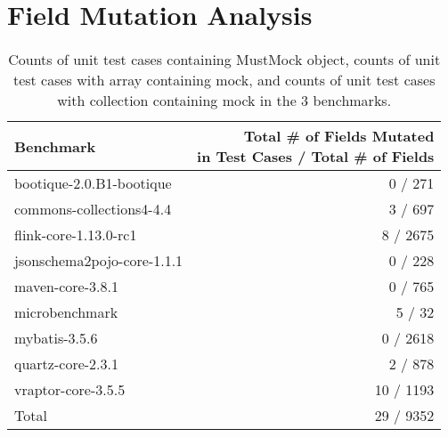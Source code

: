 \chapter{Field Mutation Analysis}
\label{AppendixA}

\begin{table*}[b]
	\centering
	\caption{Counts of unit test cases containing MustMock object, counts of unit test cases with array containing mock, and counts of unit test cases with collection containing mock in the 3 benchmarks.}
	\begin{tabular}{lr}
		\toprule
		Benchmark &  \thead{ Total \# of Fields Mutated \\ in Test Cases / Total \#  of Fields} \\
		\midrule
		bootique-2.0.B1-bootique           			&  0 / 271       \\
		commons-collections4-4.4           			&  3 / 697       \\
		flink-core-1.13.0-rc1           			&  8 / 2675       \\
		jsonschema2pojo-core-1.1.1           		&  0 / 228       \\
		maven-core-3.8.1           					&  0 / 765       \\
		microbenchmark           					&  5 / 32       \\
		mybatis-3.5.6           					&  0 / 2618       \\
		quartz-core-2.3.1           				&  2 / 878       \\
		vraptor-core-3.5.5           				&  10 / 1193       \\
		\bottomrule
		Total           				&  29 / 9352       \\
	\end{tabular}
	\label{tab:mutations}
\end{table*}